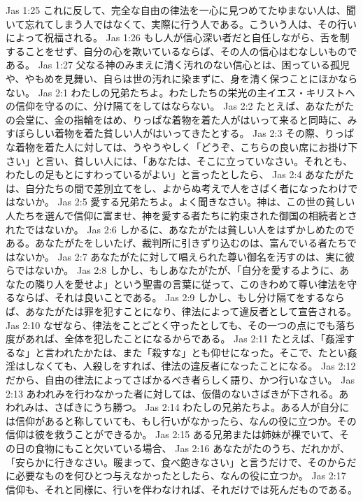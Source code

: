Jas 1:25  これに反して、完全な自由の律法を一心に見つめてたゆまない人は、聞いて忘れてしまう人ではなくて、実際に行う人である。こういう人は、その行いによって祝福される。
Jas 1:26  もし人が信心深い者だと自任しながら、舌を制することをせず、自分の心を欺いているならば、その人の信心はむなしいものである。
Jas 1:27  父なる神のみまえに清く汚れのない信心とは、困っている孤児や、やもめを見舞い、自らは世の汚れに染まずに、身を清く保つことにほかならない。
Jas 2:1  わたしの兄弟たちよ。わたしたちの栄光の主イエス・キリストへの信仰を守るのに、分け隔てをしてはならない。
Jas 2:2  たとえば、あなたがたの会堂に、金の指輪をはめ、りっぱな着物を着た人がはいって来ると同時に、みすぼらしい着物を着た貧しい人がはいってきたとする。
Jas 2:3  その際、りっぱな着物を着た人に対しては、うやうやしく「どうぞ、こちらの良い席にお掛け下さい」と言い、貧しい人には、「あなたは、そこに立っていなさい。それとも、わたしの足もとにすわっているがよい」と言ったとしたら、
Jas 2:4  あなたがたは、自分たちの間で差別立てをし、よからぬ考えで人をさばく者になったわけではないか。
Jas 2:5  愛する兄弟たちよ。よく聞きなさい。神は、この世の貧しい人たちを選んで信仰に富ませ、神を愛する者たちに約束された御国の相続者とされたではないか。
Jas 2:6  しかるに、あなたがたは貧しい人をはずかしめたのである。あなたがたをしいたげ、裁判所に引きずり込むのは、富んでいる者たちではないか。
Jas 2:7  あなたがたに対して唱えられた尊い御名を汚すのは、実に彼らではないか。
Jas 2:8  しかし、もしあなたがたが、「自分を愛するように、あなたの隣り人を愛せよ」という聖書の言葉に従って、このきわめて尊い律法を守るならば、それは良いことである。
Jas 2:9  しかし、もし分け隔てをするならば、あなたがたは罪を犯すことになり、律法によって違反者として宣告される。
Jas 2:10  なぜなら、律法をことごとく守ったとしても、その一つの点にでも落ち度があれば、全体を犯したことになるからである。
Jas 2:11  たとえば、「姦淫するな」と言われたかたは、また「殺すな」とも仰せになった。そこで、たとい姦淫はしなくても、人殺しをすれば、律法の違反者になったことになる。
Jas 2:12  だから、自由の律法によってさばかるべき者らしく語り、かつ行いなさい。
Jas 2:13  あわれみを行わなかった者に対しては、仮借のないさばきが下される。あわれみは、さばきにうち勝つ。
Jas 2:14  わたしの兄弟たちよ。ある人が自分には信仰があると称していても、もし行いがなかったら、なんの役に立つか。その信仰は彼を救うことができるか。
Jas 2:15  ある兄弟または姉妹が裸でいて、その日の食物にもこと欠いている場合、
Jas 2:16  あなたがたのうち、だれかが、「安らかに行きなさい。暖まって、食べ飽きなさい」と言うだけで、そのからだに必要なものを何ひとつ与えなかったとしたら、なんの役に立つか。
Jas 2:17  信仰も、それと同様に、行いを伴わなければ、それだけでは死んだものである。
